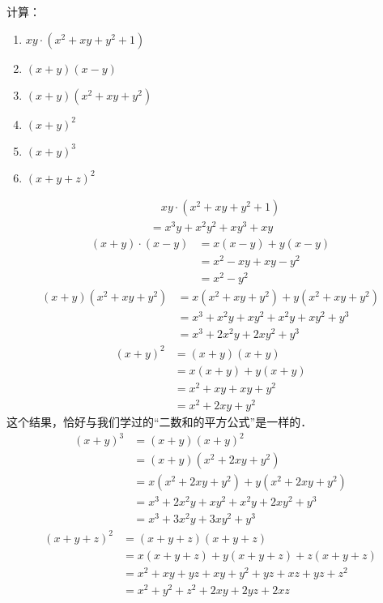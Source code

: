 \begin{example}
计算：
 \begin{multicols}{2}
\begin{enumerate}
    \item $xy\cdot (x^2+xy+y^2+1)$
    \item $(x+y)(x-y)$
    \item $(x+y)(x^2+xy+y^2)$
    \item $(x+y)^2$
    \item $(x+y)^3$
    \item $(x+y+z)^2$
\end{enumerate}
    \end{multicols}

\end{example}

\begin{solution}
\begin{align*}
     &\quad    xy\cdot (x^2+xy+y^2+1)\\
     &=x^3y+x^2y^2+xy^3+xy \tag{分配律}
    \end{align*}
\begin{align*}
        (x+y)\cdot (x-y)&=x(x-y)+y(x-y) \tag{分配律}\\
        &=x^2-xy+xy-y^2  \\
        &=x^2-y^2\tag{合并同类项法则}
    \end{align*}
\begin{align*}
        (x+y)(x^2+xy+y^2)&= x(x^2+xy+y^2)+y(x^2+xy+y^2)\\
        &=x^3+x^2y+xy^2+x^2y+xy^2+y^3\\
        &=x^3+2x^2y+2xy^2+y^3
    \end{align*}
\begin{align*}
        (x+y)^2&=(x+y)(x+y)\\
        &=x(x+y)+y(x+y)\\
        &=x^2+xy+xy+y^2\\
        &=x^2+2xy+y^2
    \end{align*}
    这个结果，恰好与我们学过的“二数和的平方公式”是一样的．
\begin{align*}
        (x+y)^3&=(x+y)(x+y)^2\\
        &=(x+y)(x^2+2xy+y^2)\\
        &=x(x^2+2xy+y^2)+y(x^2+2xy+y^2)\\
        &=x^3+2x^2y+xy^2+x^2y+2xy^2+y^3     \\
        &=x^3+3x^2y+3xy^2+y^3
    \end{align*}
\begin{align*}
        (x+y+z)^2&=(x+y+z)(x+y+z)\\
        &=x(x+y+z)+y(x+y+z)+z(x+y+z)\\
        &=x^2+xy+yz+xy+y^2+yz+xz+yz+z^2\\
        &=x^2+y^2+z^2+2xy+2yz+2xz    \\
    \end{align*}
\end{solution}

